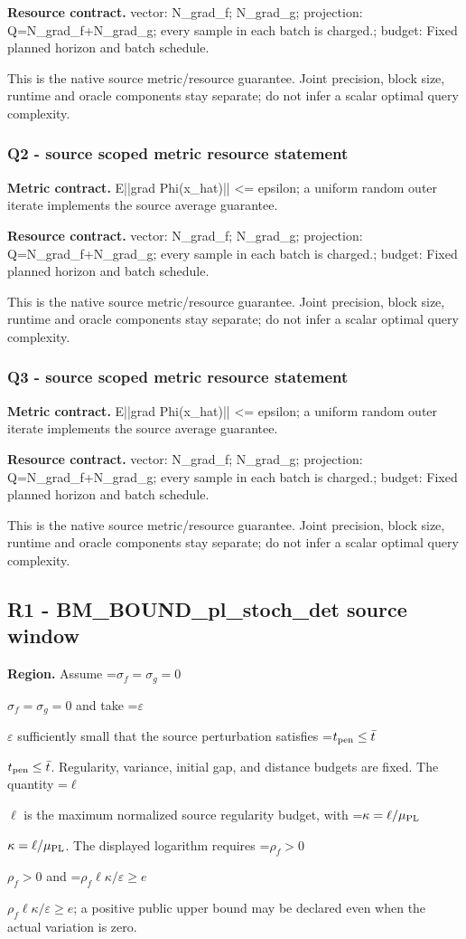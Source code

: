 \documentclass[10pt,a4paper]{article}
\newcommand{\AtlasMath}[1]{\par\begingroup\centering\setbox0=\hbox{$\displaystyle #1$}\ifdim\wd0>1.4\linewidth\typeout{ATLAS WIDE FORMULA: \the\wd0}\fi\ifdim\wd0>\linewidth\resizebox{\linewidth}{!}{\box0}\else\box0\fi\par\endgroup}
\newcommand{\AtlasInlineMath}[1]{\begingroup\setbox0=\hbox{$#1$}\ifdim\wd0>.4\linewidth\endgroup\AtlasMath{#1}\else\endgroup$#1$\fi}
\begin{document}
\textbf{Resource contract.} vector: N\_grad\_f; N\_grad\_g; projection: Q=N\_grad\_f+N\_grad\_g; every sample in each batch is charged.; budget: Fixed planned horizon and batch schedule.

This is the native source metric/resource guarantee. Joint precision, block size, runtime and oracle components stay separate; do not infer a scalar optimal query complexity.

\subsubsection{Q2 - source scoped metric resource statement}
\textbf{Metric contract.} E||grad Phi(x\_hat)|| <= epsilon; a uniform random outer iterate implements the source average guarantee.

\textbf{Resource contract.} vector: N\_grad\_f; N\_grad\_g; projection: Q=N\_grad\_f+N\_grad\_g; every sample in each batch is charged.; budget: Fixed planned horizon and batch schedule.

This is the native source metric/resource guarantee. Joint precision, block size, runtime and oracle components stay separate; do not infer a scalar optimal query complexity.

\subsubsection{Q3 - source scoped metric resource statement}
\textbf{Metric contract.} E||grad Phi(x\_hat)|| <= epsilon; a uniform random outer iterate implements the source average guarantee.

\textbf{Resource contract.} vector: N\_grad\_f; N\_grad\_g; projection: Q=N\_grad\_f+N\_grad\_g; every sample in each batch is charged.; budget: Fixed planned horizon and batch schedule.

This is the native source metric/resource guarantee. Joint precision, block size, runtime and oracle components stay separate; do not infer a scalar optimal query complexity.

\subsection{R1 - BM\_BOUND\_pl\_stoch\_det source window}
\textbf{Region.} Assume \AtlasInlineMath{\sigma_f=\sigma_g=0} and take \AtlasInlineMath{\varepsilon} sufficiently small that the source perturbation satisfies \AtlasInlineMath{t_{\rm pen}\le\bar t}. Regularity, variance, initial gap, and distance budgets are fixed. The quantity \AtlasInlineMath{\ell} is the maximum normalized source regularity budget, with \AtlasInlineMath{\kappa=\ell/\mu_{\rm PL}}. The displayed logarithm requires \AtlasInlineMath{\rho_f>0} and \AtlasInlineMath{\rho_f\ell\kappa/\varepsilon\ge e}; a positive public upper bound may be declared even when the actual variation is zero.
\end{document}
